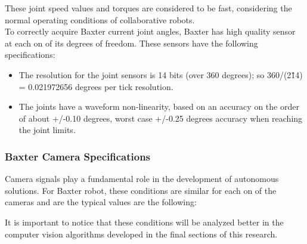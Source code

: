 \documentclass[11pt]{report} %
\begin{document}
These joint speed values and torques are considered to be fast, considering the normal operating conditions of collaborative robots.\\

To correctly acquire Baxter current joint angles, Baxter has high quality sensor at each on of its degrees of freedom. These sensors have the following specifications:

\begin{itemize}
    \item The resolution for the joint sensors is 14 bits (over 360 degrees); so 360/(2\^14) = 0.021972656 degrees per tick resolution.
    \item The joints have a waveform non-linearity, based on an accuracy on the order of about +/-0.10 degrees, worst case +/-0.25 degrees accuracy when reaching the joint limits.
\end{itemize}

\subsubsection{Baxter Camera Specifications}

Camera signals play a fundamental role in the development of autonomous solutions. For Baxter robot, these conditions are similar for each on of the cameras and are the typical values are the following:

\begin{table}[H]
\begin{center}
\caption{\label{tab:camera_specifications} Camera specifications for Baxter robot. Adapted from \citep{cite_baxter_hardware_specifications}.}
\end{center}
\end{table}

It is important to notice that these conditions will be analyzed better in the computer vision algorithms developed in the final sections of this research.\\
\end{document}
